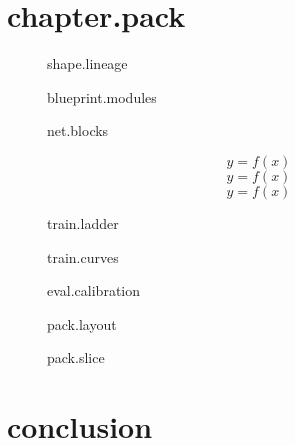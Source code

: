 \documentclass{report}
\begin{document}
\section{chapter.pack}\label{vega:chapter.pack}
\begin{figure}\caption{shape.lineage}\label{vega:shape.lineage}\end{figure}
\begin{figure}\caption{blueprint.modules}\label{vega:blueprint.modules}\end{figure}
\begin{figure}\caption{net.blocks}\label{vega:net.blocks}\end{figure}
\begin{table}\caption{net.decisions}\label{vega:net.decisions}\end{table}
\begin{equation}\label{vega:net.forward} y = f(x) \end{equation}
\begin{equation}\label{vega:net.loss} y = f(x) \end{equation}
\begin{equation}\label{vega:net.update} y = f(x) \end{equation}
\begin{figure}\caption{train.ladder}\label{vega:train.ladder}\end{figure}
\begin{figure}\caption{train.curves}\label{vega:train.curves}\end{figure}
\begin{table}\caption{eval.metrics}\label{vega:eval.metrics}\end{table}
\begin{figure}\caption{eval.calibration}\label{vega:eval.calibration}\end{figure}
\begin{figure}\caption{pack.layout}\label{vega:pack.layout}\end{figure}
\begin{figure}\caption{pack.slice}\label{vega:pack.slice}\end{figure}
\section{conclusion}\label{vega:conclusion}
\end{document}
